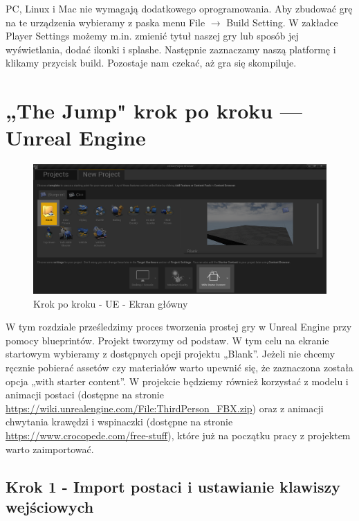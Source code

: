 \documentclass[12pt]{xmgr}
\begin{document}
PC, Linux i Mac nie wymagają dodatkowego oprogramowania. Aby zbudować grę na te urządzenia wybieramy z paska menu File $\rightarrow$ Build Setting. W zakładce Player Settings możemy m.in. zmienić tytuł naszej gry lub sposób jej wyświetlania, dodać ikonki i splashe. Następnie zaznaczamy naszą platformę i klikamy przycisk build. Pozostaje nam czekać, aż gra się skompiluje.

\chapter{„The Jump" krok po kroku — Unreal Engine}

\begin{figure}[!htb]
    \begin{center}
    \includegraphics[scale=0.35]{Screeny/UeKrokPoKroku/UE-Climb-NewProject.png}
    \end{center}
    \caption{Krok po kroku - UE - Ekran główny}
\end{figure}

W tym rozdziale prześledzimy proces tworzenia prostej gry w Unreal Engine przy pomocy blueprintów. Projekt tworzymy od podstaw. W tym celu na ekranie startowym wybieramy z dostępnych opcji projektu „Blank”. Jeżeli nie chcemy ręcznie pobierać assetów czy materiałów warto upewnić się, że zaznaczona została opcja „with starter content”. W projekcie będziemy również korzystać z modelu i animacji postaci (dostępne na stronie \url{https://wiki.unrealengine.com/File:ThirdPerson_FBX.zip}) oraz z animacji chwytania krawędzi i wspinaczki (dostępne na stronie \url{https://www.crocopede.com/free-stuff}), które już na początku pracy z projektem warto zaimportować.

\section{Krok 1 - Import postaci i ustawianie klawiszy wejściowych}
\end{document}
